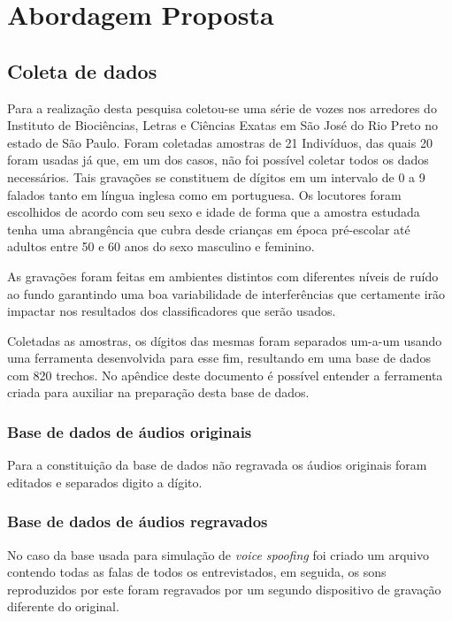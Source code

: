 \chapter{Abordagem Proposta} \label{chap:propApproach}
	\begin{myenv}{1.5}
		\section{Coleta de dados}
			\par Para a realização desta pesquisa coletou-se uma série de vozes nos arredores do Instituto de Biociências, Letras e Ciências Exatas em São José do Rio Preto no estado de São Paulo. Foram coletadas amostras de 21 Indivíduos, das quais 20 foram usadas já que, em um dos casos, não foi possível coletar todos os dados necessários. Tais gravações se constituem de dígitos em um intervalo de 0 a 9 falados tanto em língua inglesa como em portuguesa. Os locutores foram escolhidos de acordo com seu sexo e idade de forma que a amostra estudada tenha uma abrangência que cubra desde crianças em época pré-escolar até adultos entre 50 e 60 anos do sexo masculino e feminino.
						
			\par As gravações foram feitas em ambientes distintos com diferentes níveis de ruído ao fundo garantindo uma boa variabilidade de interferências que certamente irão impactar nos resultados dos classificadores que serão usados.
			
			\par Coletadas as amostras, os dígitos das mesmas foram separados um-a-um usando uma ferramenta desenvolvida para esse fim, resultando em uma base de dados com 820 trechos. No apêndice deste documento é possível entender a ferramenta criada para auxiliar na preparação desta base de dados.
			
			\subsection{Base de dados de áudios originais}
				\par Para a constituição da base de dados não regravada os áudios originais foram editados e separados digito a dígito.
	
			\subsection{Base de dados de áudios regravados}
				\par No caso da base usada para simulação de \textit{voice spoofing} foi criado um arquivo contendo todas as falas de todos os entrevistados, em seguida, os sons reproduzidos por este foram regravados por um segundo dispositivo de gravação diferente do original.


\end{myenv}
